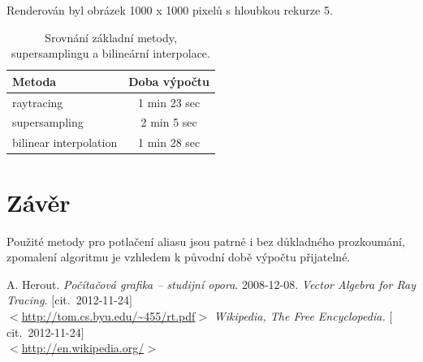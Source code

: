 \documentclass[a4paper, 12pt]{article}
\begin{document}
Renderován byl obrázek 1000 x 1000 pixelů s hloubkou rekurze 5.
\begin{table}[H]
\begin{center}
\renewcommand{\arraystretch}{1.3} %
\begin{tabular}{|l|c|}\hline%
Metoda&Doba výpočtu\\\hline%
raytracing&1 min 23 sec\\
supersampling&2 min 5 sec\\
bilinear interpolation&1 min 28 sec\\
\hline
\end{tabular}
\renewcommand{\arraystretch}{1} %
\end{center}
\caption{Srovnání základní metody, supersamplingu a bilineární interpolace.}
\label{ps_history}
\end{table}



\section{Závěr}

Použité metody pro potlačení aliasu jsou patrné i bez důkladného prozkoumání, zpomalení algoritmu je vzhledem k původní
době výpočtu přijatelné.

%
%
\newpage
{%
    \renewcommand{\refname}{Literatura} %
    \newcommand{\bi}[4]{\bibitem{#1}\textit{#2.} #3\\{}$<$\url{#4}$>$}%
    \newcommand{\citdatum}[1][2011-10-08]{$[$cit.~{#1}$]$}%
%
\begin{thebibliography}{MM}%
 A. Herout. \textit{Počítačová grafika -- studijní opora}. 2008-12-08.
\bi{vbr}{Vector Algebra for Ray Tracing}{\citdatum[2012-11-24]}
    {http://tom.cs.byu.edu/~455/rt.pdf}
\bi{wikipedia}{Wikipedia, The Free Encyclopedia}{\citdatum[2012-11-24]}
    {http://en.wikipedia.org/}
\end{thebibliography}}
\end{document}
